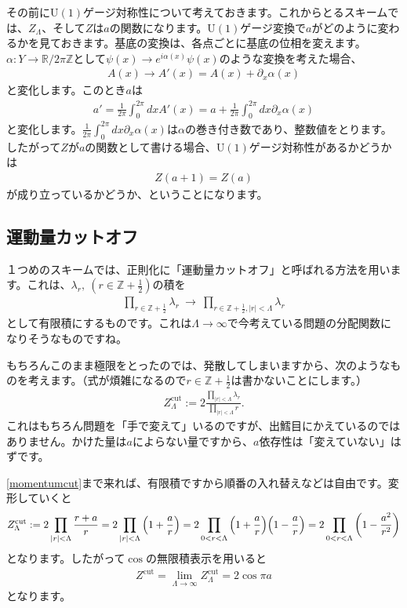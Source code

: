 \documentclass[paper=a4, fontsize=12pt, line_length=16cm, number_of_lines=33,dvipdfmx]{jlreq}
\numberwithin{equation}{section}
\newcommand{\del}{\partial}
\newcommand{\Rb}{\mathbb{R}}
\newcommand{\Zb}{\mathbb{Z}}
\newcommand{\halfint}{\Zb+\frac{1}{2}}
\newcommand{\U}{\mathrm{U}}
\newcommand{\Zcut}{Z^{\mathrm{cut}}}
\begin{document}
その前に$\U(1)$ゲージ対称性について考えておきます。これからとるスキームでは、$Z_{\Lambda}$、そして$Z$は$a$の関数になります。$\U(1)$ゲージ変換で$a$がどのように変わるかを見ておきます。基底の変換は、各点ごとに基底の位相を変えます。$\alpha:Y\to \Rb/2\pi \Zb$として$\psi(x)\to e^{i\alpha(x)}\psi(x)$のような変換を考えた場合、
\begin{align}
  A(x)\to A'(x)=A(x)+\del_{x}\alpha(x)
\end{align}
と変化します。このとき$a$は
\begin{align}
  a'=\frac{1}{2\pi}\int_{0}^{2\pi}dx A'(x)=a+\frac{1}{2\pi}\int_{0}^{2\pi}dx \del_{x}\alpha(x)
\end{align}
と変化します。$\frac{1}{2\pi}\int_{0}^{2\pi}dx \del_{x}\alpha(x)$は$\alpha$の巻き付き数であり、整数値をとります。したがって$Z$が$a$の関数として書ける場合、$\U(1)$ゲージ対称性があるかどうかは
\begin{align}
  Z(a+1)=Z(a)
\end{align}
が成り立っているかどうか、ということになります。


\subsection{運動量カットオフ}
１つめのスキームでは、正則化に「運動量カットオフ」と呼ばれる方法を用います。これは、$\lambda_r,\ (r\in \halfint)$の積を
\begin{align}
  \prod_{r\in \halfint}\lambda_r\ \longrightarrow\ \prod_{r\in \halfint, |r|<\Lambda}\lambda_r
\end{align}
として有限積にするものです。これは$\Lambda\to\infty$で今考えている問題の分配関数になりそうなものですね。

もちろんこのまま極限をとったのでは、発散してしまいますから、次のようなものを考えます。（式が煩雑になるので$r\in\halfint$は書かないことにします。）
\begin{align}
  \Zcut_{\Lambda}:=2\frac{\prod_{|r|<\Lambda}\lambda_r}{\prod_{|r|<\Lambda}r}.\label{momentumcut}
\end{align}
これはもちろん問題を「手で変えて」いるのですが、出鱈目にかえているのではありません。かけた量は$a$によらない量ですから、$a$依存性は「変えていない」はずです。

\eqref{momentumcut}まで来れば、有限積ですから順番の入れ替えなどは自由です。変形していくと
\begin{align}
  \Zcut_{\Lambda}:=
  2\prod_{|r|<\Lambda}\frac{r+a}{r}
  =2\prod_{|r|<\Lambda}\qty(1+\frac{a}{r})
  =2\prod_{0<r<\Lambda}\qty(1+\frac{a}{r})\qty(1-\frac{a}{r})
  =2\prod_{0<r<\Lambda}\qty(1-\frac{a^2}{r^2})
\end{align}
となります。したがって$\cos$の無限積表示を用いると
\begin{align}
  \Zcut=\lim_{\Lambda\to \infty}\Zcut_{\Lambda}=2\cos \pi a\label{cutparitionfunction}
\end{align}
となります。
\end{document}
